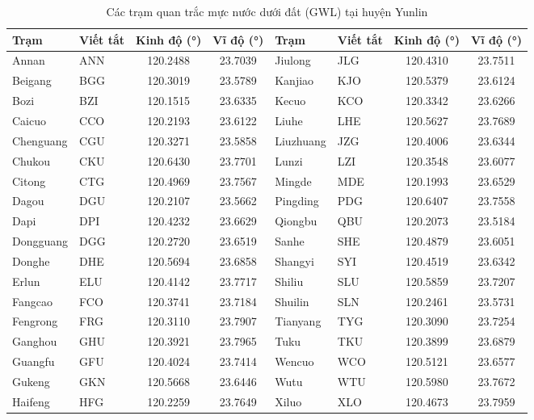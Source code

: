 \begin{table}[htbp]
	\centering
	\footnotesize
	\setlength{\tabcolsep}{2.5pt}
	\caption{Các trạm quan trắc mực nước dưới đất (GWL) tại huyện Yunlin}
	\label{tab:gwl_info}
	\begin{tabular}{llcc|llcc}
		\toprule
		\textbf{Trạm} & \textbf{Viết tắt} & \textbf{Kinh độ (\si{\degree})} & \textbf{Vĩ độ (\si{\degree})} & \textbf{Trạm} & \textbf{Viết tắt} & \textbf{Kinh độ (\si{\degree})} & \textbf{Vĩ độ (\si{\degree})} \\
		\midrule
		Annan & ANN & 120.2488 & 23.7039 & Jiulong & JLG & 120.4310 & 23.7511 \\
		Beigang & BGG & 120.3019 & 23.5789 & Kanjiao & KJO & 120.5379 & 23.6124 \\
		Bozi & BZI & 120.1515 & 23.6335 & Kecuo & KCO & 120.3342 & 23.6266 \\
		Caicuo & CCO & 120.2193 & 23.6122 & Liuhe & LHE & 120.5627 & 23.7689 \\
		Chenguang & CGU & 120.3271 & 23.5858 & Liuzhuang & JZG & 120.4006 & 23.6344 \\
		Chukou & CKU & 120.6430 & 23.7701 & Lunzi & LZI & 120.3548 & 23.6077 \\
		Citong & CTG & 120.4969 & 23.7567 & Mingde & MDE & 120.1993 & 23.6529 \\
		Dagou & DGU & 120.2107 & 23.5662 & Pingding & PDG & 120.6407 & 23.7558 \\
		Dapi & DPI & 120.4232 & 23.6629 & Qiongbu & QBU & 120.2073 & 23.5184 \\
		Dongguang & DGG & 120.2720 & 23.6519 & Sanhe & SHE & 120.4879 & 23.6051 \\
		Donghe & DHE & 120.5694 & 23.6858 & Shangyi & SYI & 120.4519 & 23.6342 \\
		Erlun & ELU & 120.4142 & 23.7717 & Shiliu & SLU & 120.5859 & 23.7207 \\
		Fangcao & FCO & 120.3741 & 23.7184 & Shuilin & SLN & 120.2461 & 23.5731 \\
		Fengrong & FRG & 120.3110 & 23.7907 & Tianyang & TYG & 120.3090 & 23.7254 \\
		Ganghou & GHU & 120.3921 & 23.7965 & Tuku & TKU & 120.3899 & 23.6879 \\
		Guangfu & GFU & 120.4024 & 23.7414 & Wencuo & WCO & 120.5121 & 23.6577 \\
		Gukeng & GKN & 120.5668 & 23.6446 & Wutu & WTU & 120.5980 & 23.7672 \\
		Haifeng & HFG & 120.2259 & 23.7649 & Xiluo & XLO & 120.4673 & 23.7959 \\

\end{tabular}
\end{table}
